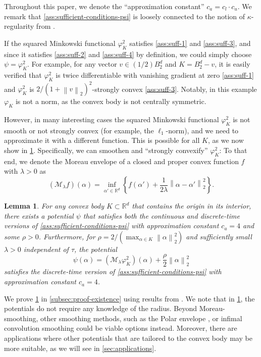 \documentclass[a4paper]{article}
\newcommand{\mathset}[1]{\left\{#1\right\}}
\newcommand{\norm}[1]{\left\|#1\right\|}
\newcommand{\RR}[0]{\mathbb{R}}
\newcommand{\cM}[0]{\mathcal{M}}
\theoremstyle{thmstyle}
\newtheorem{lemma}{Lemma}
\theoremstyle{defstyle}
\theoremstyle{remark}
\begin{document}
\noindent Throughout this paper, we denote the ``approximation constant'' $c_a = c_l\cdot c_u$.
We remark that \cref{ass:sufficient-conditions-psi} is loosely connected to the notion of $\kappa$-regularity from \cite[Def. 2.1]{Juditsky2008large}.

If the squared Minkowski functional $\varphi_K^2$ satisfies \ref{ass:suff-1} and \ref{ass:suff-3}, and since it satisfies \ref{ass:suff-2} and  \ref{ass:suff-4} by definition, we could simply choose $\psi=\varphi_K^2$. 
For example, for any vector $v\in (1/2)B_2^d$ and $K=B_2^d-v$,
it is easily verified that $\varphi_K^2$ is twice differentiable with vanishing gradient at zero \ref{ass:suff-1} and $\varphi_K^2$ is $2/(1+\norm{v}_2)^2$-strongly convex \ref{ass:suff-3}. Notably, in this example $\varphi_K$ is not a norm, as the convex body is not centrally symmetric.

However, in many interesting cases the squared Minkowski functional $\varphi_K^2$ is not smooth or not strongly convex (for example, the $\ell_1$-norm), and we need to approximate it with a different function. This is possible for all $K$, as we now show in \cref{lem:existence}. Specifically, we can smoothen and ``strongly convexify'' $\varphi_K^2$: To that end, we denote the Moreau envelope \citep{Moreau1965proximite} of a closed and proper convex function $f$ with $\lambda>0$ as
\begin{equation*}
    (\cM_{\lambda} f)(\alpha)=\inf_{\alpha'\in\RR^d}\mathset{f(\alpha')+\frac{1}{2\lambda}\norm{\alpha-\alpha'}_2^2}.
\end{equation*}

\begin{lemma}
    \label{lem:existence}
    For any convex body $K\subset \RR^d$ that contains the origin in its interior, there exists a potential $\psi$ that satisfies both the continuous and discrete-time versions of \cref{ass:sufficient-conditions-psi} with approximation constant $c_a=4$ and some $\rho>0$. 
    Furthermore, for $\rho=2/(\max_{\alpha\in K}\norm{\alpha}_2^2)$ and sufficiently small $\lambda >0$ independent of $\tau$, the potential
    \begin{equation*}
        \psi(\alpha)=(\cM_{\lambda }\varphi_K^2)(\alpha) + \frac{\rho}{2}\norm{\alpha}_2^2 
    \end{equation*}
    satisfies the discrete-time version of \cref{ass:sufficient-conditions-psi} with approximation constant $c_a = 4$.
\end{lemma}
\noindent We prove \cref{lem:existence} in \cref{subsec:proof-existence} using results from \cite{Planiden2019proximal}. We note that in \cref{lem:existence}, the potentials do not require any knowledge of the radius. Beyond Moreau-smoothing, other smoothing methods, such as the Polar envelope \citep{Friedlander2019polar},
or infimal convolution smoothing \citep{Beck2012smoothing} could be viable options instead. Moreover, there are applications where other potentials that are tailored to the convex body may be more suitable, as we will see in \cref{sec:applications}.
\end{document}
